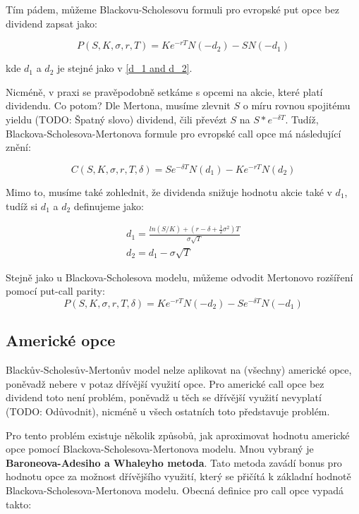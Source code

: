 \documentclass[male,czech,api_bc]{kitheses}
\begin{document}
  Tím pádem, můžeme Blackovu-Scholesovu formuli pro evropské put opce bez dividend zapsat jako:

  \begin{equation}
    P(S, K, \sigma, r, T) = Ke^{-rT}N(-d_2) - SN(-d_1)
  \end{equation}

  kde $d_1$ a $d_2$ je stejné jako v \ref{d_1 and d_2}.

  Nicméně, v praxi se pravěpodobně setkáme s opcemi na akcie, které platí dividendu. Co potom? Dle Mertona, musíme zlevnit $S$ o míru rovnou spojitému yieldu (TODO: Špatný slovo) dividend, čili převézt $S$ na $S * e^{-\delta T}$. Tudíž, Blackova-Scholesova-Mertonova formule pro evropské call opce má následující znění:

  \begin{equation}
    C(S, K, \sigma, r, T, \delta) = Se^{-\delta T}N(d_1) - Ke^{-rT}N(d_2)
  \end{equation}

  Mimo to, musíme také zohlednit, že dividenda snižuje hodnotu akcie také v $d_1$, tudíž si $d_1$ a $d_2$ definujeme jako:

  \begin{gather}
    d_1 = \frac{ln(S/K) + (r - \delta + \frac{1}{2}\sigma ^ 2)T}{\sigma \sqrt{T}} \\
    d_2 = d_1 - \sigma \sqrt{T}
  \end{gather}

  Stejně jako u Blackova-Scholesova modelu, můžeme odvodit Mertonovo rozšíření pomocí put-call parity:
  \begin{equation}
    P(S, K, \sigma, r, T, \delta) = Ke^{-rT}N(-d_2) - Se^{-\delta T}N(-d_1) 
  \end{equation}

  \subsection{Americké opce}

  Blackův-Scholesův-Mertonův model nelze aplikovat na (všechny) americké opce, poněvadž nebere v potaz dřívější využití opce. Pro americké call opce bez dividend toto není problém, poněvadž u těch se dřívější využití nevyplatí (TODO: Odůvodnit), nicméně u všech ostatních toto představuje problém.

  Pro tento problém existuje několik způsobů, jak aproximovat hodnotu americké opce pomocí Blackova-Scholesova-Mertonova modelu. Mnou vybraný je \textbf{Baroneova-Adesiho a Whaleyho metoda}. Tato metoda zavádí bonus pro hodnotu opce za možnost dřívějšího využití, který se přičítá k základní hodnotě Blackova-Scholesova-Mertonova modelu. Obecná definice pro call opce vypadá takto:
\end{document}
